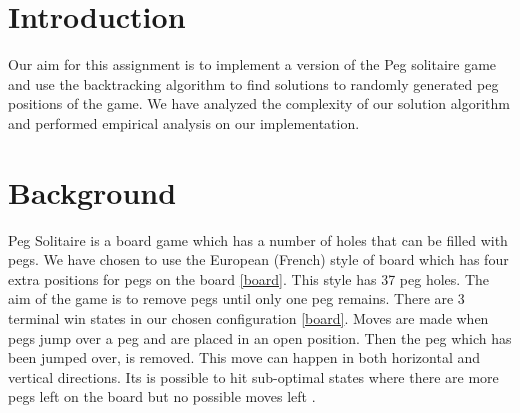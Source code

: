 \documentclass[a4paper]{article}
\begin{document}
\begin{titlepage}

 

\vfill %

\end{titlepage}

\clearpage
\setcounter{page}{1}



\section{Introduction}
Our aim for this assignment is to implement a version of the Peg solitaire game and use the backtracking algorithm to find solutions to randomly generated peg positions of the game. We have analyzed the complexity of our solution algorithm and performed empirical analysis on our implementation.

\section{Background}
Peg Solitaire is a board game which has a number of holes that can be filled with pegs. We have chosen to use the European (French) style of board which has four extra positions for pegs on the board \ref{board}. This style has 37 peg holes. The aim of the game is to remove pegs until only one peg remains. There are 3 terminal win states in our chosen configuration \ref{board}. Moves are made when pegs jump over a peg and are placed in an open position. Then the peg which has been jumped over, is removed. This move can happen in both horizontal and vertical directions. Its is possible to hit sub-optimal states where there are more pegs left on the board but no possible moves left \cite{harder}. 
\end{document}
